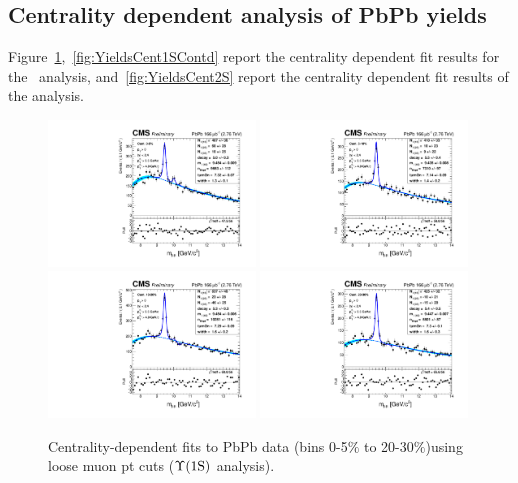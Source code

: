 \subsection{Centrality dependent analysis of PbPb yields}
\label{sec:figs_cent}
Figure~\ref{fig:YieldsCent1S},~\ref{fig:YieldsCent1SContd} report the centrality dependent fit results
for the \PgUa\ analysis,
and~\ref{fig:YieldsCent2S} report the centrality dependent fit
results of the \PgUb analysis.
\begin{figure}
 \includegraphics[width=0.49\textwidth]{Chapters/aYield/PbPb/pt_3p5_4/Centrality/Cent_0_5/PbPb_Cent_0_5_fsr1.pdf}
  \includegraphics[width=0.49\textwidth]{Chapters/aYield/PbPb/pt_3p5_4/Centrality/Cent_5_10/PbPb_Cent_5_10_fsr1.pdf}
  \includegraphics[width=0.49\textwidth]{Chapters/aYield/PbPb/pt_3p5_4/Centrality/Cent_10_20/PbPb_Cent_10_20_fsr1.pdf}
  \includegraphics[width=0.49\textwidth]{Chapters/aYield/PbPb/pt_3p5_4/Centrality/Cent_20_30/PbPb_Cent_20_30_fsr1.pdf}
 \caption{Centrality-dependent fits to PbPb data (bins 0-5$\%$
   to 20-30$\%$)using loose muon
   pt cuts ($\Upsilon\mathrm{(1S)}$ analysis).}
 \label{fig:YieldsCent1S} 
\end{figure}
